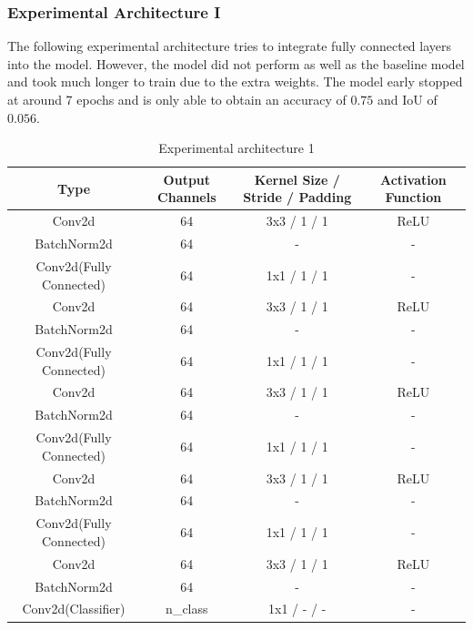 \documentclass{article}
\begin{document}
\subsubsection{Experimental Architecture I}
The following experimental architecture tries to integrate fully connected layers into the model.
However, the model did not perform as well as the baseline model and took much longer to train due to the extra weights.
The model early stopped at around 7 epochs and is only able to obtain an accuracy of $0.75$ and IoU of $0.056$.
\begin{table}[h!]
\caption{Experimental architecture 1}
\label{tab:experimental_1}
\centering
\begin{tabular}{cccc}
  \toprule
  \textbf{Type} & \textbf{Output Channels} & \textbf{Kernel Size / Stride / Padding} & \textbf{Activation Function} \\ 
  \midrule
  Conv2d & 64 & 3x3 / 1 / 1 & ReLU \\ 
  BatchNorm2d & 64 & - & - \\ 
  Conv2d(Fully Connected) & 64 & 1x1 / 1 / 1 & - \\
  Conv2d & 64 & 3x3 / 1 / 1 & ReLU \\ 
  BatchNorm2d & 64 & - & - \\ 
  Conv2d(Fully Connected) & 64 & 1x1 / 1 / 1 & - \\
  Conv2d & 64 & 3x3 / 1 / 1 & ReLU \\ 
  BatchNorm2d & 64 & - & - \\ 
  Conv2d(Fully Connected) & 64 & 1x1 / 1 / 1 & - \\
  Conv2d & 64 & 3x3 / 1 / 1 & ReLU \\ 
  BatchNorm2d & 64 & - & - \\ 
  Conv2d(Fully Connected) & 64 & 1x1 / 1 / 1 & - \\
  Conv2d & 64 & 3x3 / 1 / 1 & ReLU \\ 
  BatchNorm2d & 64 & - & - \\ 
  Conv2d(Classifier) & n\_class & 1x1 / - / - & - \\ 
  \bottomrule
\end{tabular}
\end{table}
\end{document}

